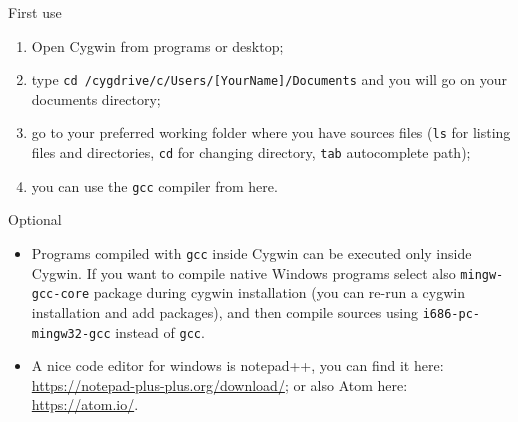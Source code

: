 \begin{frame}
  \begin{block}{First use}
    \begin{enumerate}
    \item Open Cygwin from programs or desktop;
    \item type \alert{\texttt{cd
          /cygdrive/c/Users/[YourName]/Documents}} and you will go on
      your documents directory;
    \item go to your preferred working folder where you have sources
      files (\alert{\texttt{ls}} for listing files and directories,
      \alert{\texttt{cd}} for changing directory, \alert{\texttt{tab}}
      autocomplete path);
    \item you can use the \alert{\texttt{gcc}} compiler from here.
    \end{enumerate}
  \end{block}
  \begin{block}{Optional}
    \begin{itemize}
    \item Programs compiled with \alert{\texttt{gcc}} inside Cygwin
      can be executed only inside Cygwin.
      If you want to compile native Windows programs select also
      \alert{\texttt{mingw-gcc-core}} package during cygwin installation
      (you can re-run a cygwin installation and add packages), and then
      compile sources using \alert{\texttt{i686-pc-mingw32-gcc}} instead
      of \alert{\texttt{gcc}}.
    \item A nice code editor for windows is \alert{notepad++}, you can
      find it here: \url{https://notepad-plus-plus.org/download/}; or
      also \alert{Atom} here: \url{https://atom.io/}.
    \end{itemize}
  \end{block}  
\end{frame}

